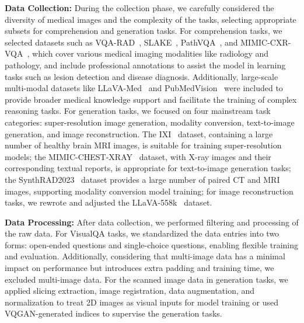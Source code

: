 \noindent \textbf{Data Collection:} During the collection phase, we carefully considered the diversity of medical images and the complexity of the tasks, selecting appropriate subsets for comprehension and generation tasks. For comprehension tasks, we selected datasets such as VQA-RAD~\cite{lau2018dataset}, SLAKE~\cite{liu2021slake}, PathVQA~\cite{he2020pathvqa}, and MIMIC-CXR-VQA~\cite{bae2024mimic}, which cover various medical imaging modalities like radiology and pathology, and include professional annotations to assist the model in learning tasks such as lesion detection and disease diagnosis. Additionally, large-scale multi-modal datasets like LLaVA-Med~\cite{li2024llava} and PubMedVision~\cite{chen2024huatuogpt} were included to provide broader medical knowledge support and facilitate the training of complex reasoning tasks. For generation tasks, we focused on four mainstream task categories: super-resolution image generation, modality conversion, text-to-image generation, and image reconstruction. The IXI~\cite{IXI} dataset, containing a large number of healthy brain MRI images, is suitable for training super-resolution models; the MIMIC-CHEST-XRAY~\cite{bae2024mimic} dataset, with X-ray images and their corresponding textual reports, is appropriate for text-to-image generation tasks; the SynthRAD2023~\cite{thummerer2023synthrad2023} dataset provides a large number of paired CT and MRI images, supporting modality conversion model training; for image reconstruction tasks, we rewrote and adjusted the LLaVA-558k~\cite{liu2024improved} dataset.

\noindent \textbf{Data Processing:} After data collection, we performed filtering and processing of the raw data. For VisualQA tasks, we standardized the data entries into two forms: open-ended questions and single-choice questions, enabling flexible training and evaluation. Additionally, considering that multi-image data has a minimal impact on performance but introduces extra padding and training time, we excluded multi-image data. For the scanned image data in generation tasks, we applied slicing extraction, image registration, data augmentation, and normalization to treat 2D images as visual inputs for model training or used VQGAN-generated indices to supervise the generation tasks.

